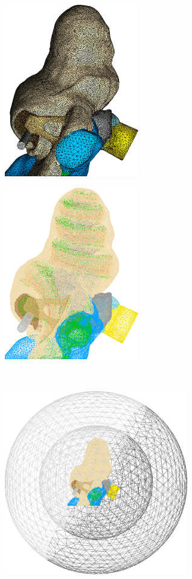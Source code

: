 \begin{figure}
	\centering
	
	\begin{subfigure}[t]{0.5\textwidth}
        \centering
        \includegraphics[height=7.5cm]{Methodology/gp_mesh_solid}
        \caption{}
        \label{fig:gp_mesh_solid}
    \end{subfigure}%
    \begin{subfigure}[t]{0.5\textwidth}
        \centering
        \includegraphics[height=7.5cm]{Methodology/gp_mesh_lines}
        \caption{}
        \label{fig:gp_mesh_lines}
    \end{subfigure}\\%
    \vspace{1em}%
    \begin{subfigure}[t]{\textwidth}
        \centering
        \includegraphics[height=8cm]{Methodology/gp_mesh_all}
        \caption{}
        \label{fig:gp_mesh_all}
    \end{subfigure}%
    

\end{figure}
